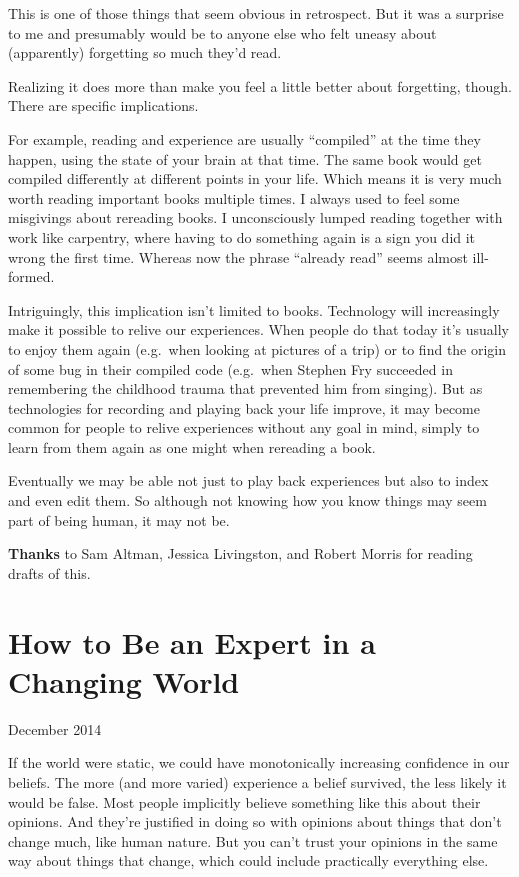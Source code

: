 \documentclass[12pt]{book}
\begin{document}
This is one of those things that seem obvious in retrospect. But it was
a surprise to me and presumably would be to anyone else who felt uneasy
about (apparently) forgetting so much they'd read.

Realizing it does more than make you feel a little better about
forgetting, though. There are specific implications.

For example, reading and experience are usually ``compiled'' at the time
they happen, using the state of your brain at that time. The same book
would get compiled differently at different points in your life. Which
means it is very much worth reading important books multiple times. I
always used to feel some misgivings about rereading books. I
unconsciously lumped reading together with work like carpentry, where
having to do something again is a sign you did it wrong the first time.
Whereas now the phrase ``already read'' seems almost ill-formed.

Intriguingly, this implication isn't limited to books. Technology will
increasingly make it possible to relive our experiences. When people do
that today it's usually to enjoy them again (e.g.~when looking at
pictures of a trip) or to find the origin of some bug in their compiled
code (e.g.~when Stephen Fry succeeded in remembering the childhood
trauma that prevented him from singing). But as technologies for
recording and playing back your life improve, it may become common for
people to relive experiences without any goal in mind, simply to learn
from them again as one might when rereading a book.

Eventually we may be able not just to play back experiences but also to
index and even edit them. So although not knowing how you know things
may seem part of being human, it may not be.

\textbf{Thanks} to Sam Altman, Jessica Livingston, and Robert Morris for
reading drafts of this.
\chapter{How to Be an Expert in a Changing World}

December 2014

If the world were static, we could have monotonically increasing
confidence in our beliefs. The more (and more varied) experience a
belief survived, the less likely it would be false. Most people
implicitly believe something like this about their opinions. And they're
justified in doing so with opinions about things that don't change much,
like human nature. But you can't trust your opinions in the same way
about things that change, which could include practically everything
else.
\end{document}
